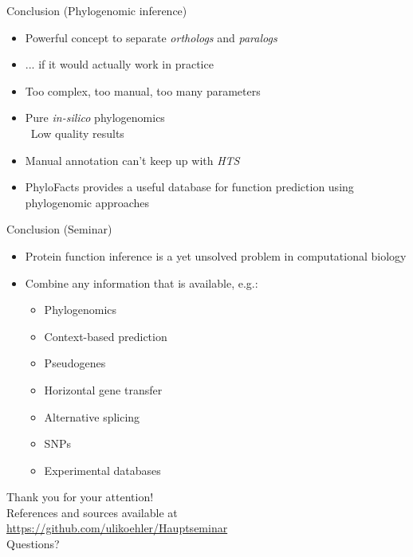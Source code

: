 \documentclass[14pt,xcolor=dvipsnames,pdftex]{beamer}
\begin{document}
 
\begin{frame}{Conclusion (Phylogenomic inference)}
 \begin{itemize}
  \item Powerful concept to separate \textit{orthologs} and \textit{paralogs}
  \pause
  \item ... if it would actually work in practice
  \item Too complex, too manual, too many parameters
  \item Pure \textit{in-silico} phylogenomics\\
  \textrightarrow\ Low quality results
  \item Manual annotation can't keep up with \textit{HTS}
  \item PhyloFacts provides a useful database for function prediction using phylogenomic approaches
 \end{itemize}
\end{frame}

\begin{frame}{Conclusion (Seminar)}
\begin{itemize}
\item Protein function inference is a yet unsolved problem in computational biology
\item Combine any information that is available, e.g.:
\begin{itemize}
 \item Phylogenomics
 \item Context-based prediction
 \item Pseudogenes
 \item Horizontal gene transfer
 \item Alternative splicing
 \item SNPs
 \item Experimental databases
\end{itemize}

\end{itemize}
\end{frame}


\begin{frame}
 \begin{center}
 {\color{BlueViolet}\large Thank you for your attention!}\\[1cm]
 {\small References and sources available at}\\
 {\small \url{https://github.com/ulikoehler/Hauptseminar}}\\[1cm]
 {\color{BlueViolet}\large Questions?}\\[1cm]
 
 \end{center}
\end{frame}
\end{document}
